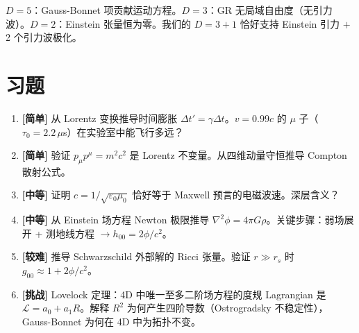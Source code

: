 \begin{limitbox}
  $D=5$：Gauss-Bonnet 项贡献运动方程。$D=3$：GR 无局域自由度（无引力波）。$D=2$：Einstein 张量恒为零。我们的 $D=3+1$ 恰好支持 Einstein 引力 $+$ 2 个引力波极化。
\end{limitbox}

\section*{习题}

\begin{enumerate}
  \item \textbf{[简单]} 从 Lorentz 变换推导时间膨胀 $\Delta t' = \gamma\Delta t$。$v=0.99c$ 的 $\mu$ 子（$\tau_0=2.2\,\mu$s）在实验室中能飞行多远？
  \item \textbf{[简单]} 验证 $p_\mu p^\mu = m^2c^2$ 是 Lorentz 不变量。从四维动量守恒推导 Compton 散射公式。
  \item \textbf{[中等]} 证明 $c=1/\sqrt{\varepsilon_0\mu_0}$ 恰好等于 Maxwell 预言的电磁波速。深层含义？
  \item \textbf{[中等]} 从 Einstein 场方程 Newton 极限推导 $\nabla^2\phi=4\pi G\rho$。关键步骤：弱场展开 + 测地线方程 $\to h_{00}=2\phi/c^2$。
  \item \textbf{[较难]} 推导 Schwarzschild 外部解的 Ricci 张量。验证 $r\gg r_s$ 时 $g_{00}\approx 1+2\phi/c^2$。
  \item \textbf{[挑战]} Lovelock 定理：4D 中唯一至多二阶场方程的度规 Lagrangian 是 $\mathcal{L}=a_0+a_1R$。解释 $R^2$ 为何产生四阶导数（Ostrogradsky 不稳定性），Gauss-Bonnet 为何在 4D 中为拓扑不变。
\end{enumerate}
